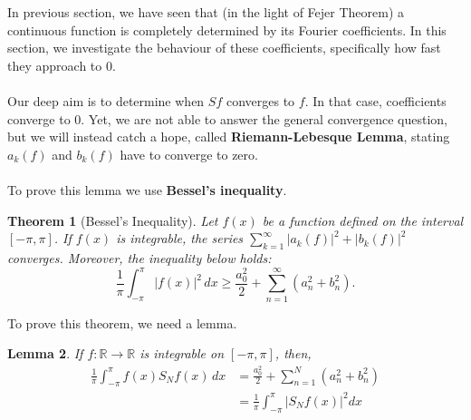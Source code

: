\documentclass[12pt]{amsart}
\newtheorem{theorem}{Theorem}[section]
\newtheorem{lemma}[theorem]{Lemma}
\theoremstyle{definition}
\begin{document}
In previous section, we have seen that (in the light of Fejer Theorem) a continuous function is completely determined by its Fourier coefficients\footnotemark{}. In this section, we investigate the behaviour of these coefficients, specifically how fast they approach to $0$. \paragraph{}
    Our deep aim is to determine when $Sf$ converges to $f$. In that case, coefficients converge to 0. Yet, we are not able to answer the general convergence question, but we will instead catch a hope, called \textbf{Riemann-Lebesque Lemma}, stating $a_k(f)$ and $b_k(f)$ have to converge to zero. \paragraph{}
    To prove this lemma we use \textbf{Bessel's inequality}.


\begin{theorem}[Bessel's Inequality]
Let $f(x)$ be a function defined on the interval $[-\pi, \pi]$. If $f(x)$ is integrable, the series $\sum_{k=1}^{\infty}|a_k(f)|^2 + |b_k(f)|^2$ converges. Moreover, the inequality below holds:
\begin{equation}
    \frac{1}{\pi} \int_{-\pi}^{\pi} |f(x)|^2 \, dx \geq \frac{a_0^2}{2} + \sum_{n=1}^{\infty} \left(a_n^2 + b_n^2\right).
\end{equation}
\end{theorem}


 To prove this theorem, we need a lemma.


 \begin{lemma}
     If $f: \mathbb{R} \to \mathbb{R}$ is integrable on $[-\pi, \pi]$, then,
     \begin{equation}
     \begin{aligned}
         \frac{1}{\pi} \int_{-\pi}^{\pi} f(x)S_Nf(x) \, dx
         &= \frac{a_0^2}{2} + \sum_{n=1}^{N} \left(a_n^2 +
         b_n^2\right)\\
         &=  \frac{1}{\pi} \int_{-\pi}^{\pi} |S_Nf(x)|^2  dx
     \end{aligned}
     \end{equation}
 \end{lemma}
\end{document}
